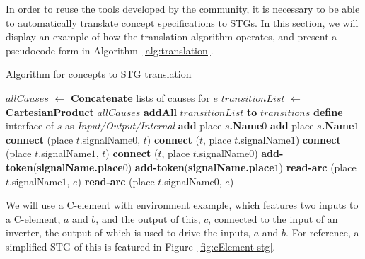 \documentclass[british,conference,compsoc]{IEEEtran}
\begin{document}
\vspace{-2mm}

In order to reuse the tools developed by the community, it is
necessary to be able to automatically translate concept specifications to STGs.
In this section, we will display an example of how the translation algorithm 
operates, and present a pseudocode form in Algorithm~\ref{alg:translation}. 

\begin{algorithm}[H]
\begin{algorithmic}[1]
\caption{Algorithm for concepts to STG translation\label{alg:translation}}
  \State $allCauses$ $\leftarrow$ \textbf{Concatenate} lists of causes for $e$ \label{alg:list}
  \State $transitionList$ $\leftarrow$ \textbf{CartesianProduct} $allCauses$
  \State \textbf{addAll} $transitionList$ \textbf{to} $transitions$
\EndFor
{}
  \State \textbf{define} interface of $s$ as \emph{Input/Output/Internal}
  \State \textbf{add} place \textbf{$s$.Name}$0$
  \State \textbf{add} place \textbf{$s$.Name}$1$
      \State \textbf{connect} (place $t$.signalName$0$, $t$)
      \State \textbf{connect} ($t$, place $t$.signalName$1$)
      \State \textbf{connect} (place $t$.signalName$1$, $t$)
      \State \textbf{connect} ($t$, place $t$.signalName$0$)
    \EndIf
  \EndFor
\EndFor
{}
    \State \textbf{add-token}(\textbf{signalName.place}$0$)
    \State \textbf{add-token}(\textbf{signalName.place}$1$)
  \EndIf
\EndFor
{}
      \State \textbf{read-arc} (place $t$.signalName$1$, $e$)
    \EndFor
      \State \textbf{read-arc} (place $t$.signalName$0$, $e$)
    \EndFor
  \EndIf
\EndFor
\end{algorithmic}
\end{algorithm}

We will use a C-element with environment example, which features two inputs to a C-element, $a$ and $b$, and the output
of this, $c$, connected to the input of an inverter, the output of which is used to drive the inputs, $a$ and $b$.
For reference, a simplified STG of this is featured in Figure~\ref{fig:cElement-stg}.
\end{document}
